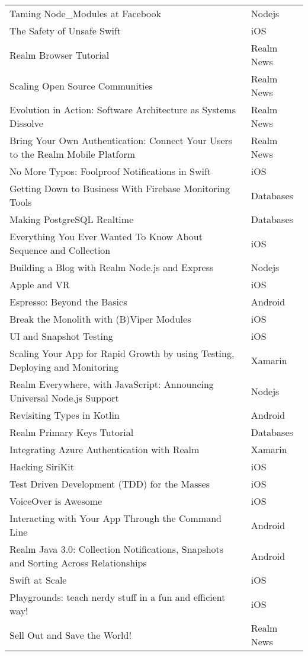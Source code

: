 \documentclass[letterpaper,11pt]{article}
\begin{document}
\begin{table}[h]
\begin{adjustbox}{max width=\linewidth}
\begin{tabular}{ | l | l |}
Taming Node\_Modules at Facebook & Nodejs \\
The Safety of Unsafe Swift & iOS \\
Realm Browser Tutorial & Realm News \\
Scaling Open Source Communities & Realm News \\
Evolution in Action: Software Architecture as Systems Dissolve & Realm News \\
Bring Your Own Authentication: Connect Your Users to the Realm Mobile Platform & Realm News \\
No More Typos: Foolproof Notifications in Swift & iOS \\
Getting Down to Business With Firebase Monitoring Tools & Databases \\
Making PostgreSQL Realtime & Databases \\
Everything You Ever Wanted To Know About Sequence and Collection & iOS \\
Building a Blog with Realm Node.js and Express & Nodejs \\
Apple and VR & iOS \\
Espresso: Beyond the Basics & Android  \\
Break the Monolith with (B)Viper Modules & iOS \\
UI and Snapshot Testing & iOS \\
Scaling Your App for Rapid Growth by using Testing, Deploying and Monitoring & Xamarin \\
Realm Everywhere, with JavaScript: Announcing Universal Node.js Support & Nodejs \\
Revisiting Types in Kotlin & Android \\
Realm Primary Keys Tutorial & Databases \\
Integrating Azure Authentication with Realm & Xamarin \\
Hacking SiriKit & iOS \\
Test Driven Development (TDD) for the Masses & iOS \\
VoiceOver is Awesome & iOS \\
Interacting with Your App Through the Command Line & Android \\
Realm Java 3.0: Collection Notifications, Snapshots and Sorting Across Relationships & Android \\
Swift at Scale & iOS \\
Playgrounds: teach nerdy stuff in a fun and efficient way! & iOS \\
Sell Out and Save the World! & Realm News \\

\end{tabular}
\end{adjustbox}
\end{table}
\end{document}
